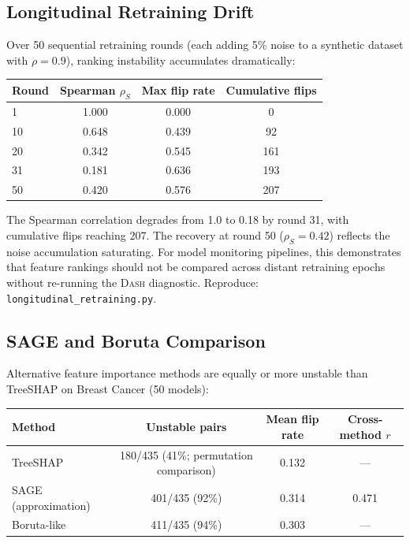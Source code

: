 \documentclass{article}
\newcommand{\DASH}{\textsc{Dash}}
\begin{document}
\subsection{Longitudinal Retraining Drift}
\label{sec:longitudinal}

Over 50 sequential retraining rounds (each adding 5\% noise to a synthetic dataset with $\rho{=}0.9$), ranking instability accumulates dramatically:

\begin{center}
\small
\begin{tabular}{@{}lccc@{}}
\toprule
Round & Spearman $\rho_S$ & Max flip rate & Cumulative flips \\
\midrule
1   & 1.000 & 0.000 & 0 \\
10  & 0.648 & 0.439 & 92 \\
20  & 0.342 & 0.545 & 161 \\
31  & 0.181 & 0.636 & 193 \\
50  & 0.420 & 0.576 & 207 \\
\bottomrule
\end{tabular}
\end{center}

The Spearman correlation degrades from 1.0 to 0.18 by round 31, with cumulative flips reaching 207. The recovery at round 50 ($\rho_S{=}0.42$) reflects the noise accumulation saturating. For model monitoring pipelines, this demonstrates that feature rankings should not be compared across distant retraining epochs without re-running the \DASH{} diagnostic.
Reproduce: \texttt{longitudinal\_retraining.py}.

\subsection{SAGE and Boruta Comparison}
\label{sec:sage-comparison}

Alternative feature importance methods are equally or more unstable than TreeSHAP on Breast Cancer (50 models):

\begin{center}
\small
\begin{tabular}{@{}lccc@{}}
\toprule
Method & Unstable pairs & Mean flip rate & Cross-method $r$ \\
\midrule
TreeSHAP             & 180/435 (41\%; permutation comparison) & 0.132 & --- \\
SAGE (approximation) & 401/435 (92\%) & 0.314 & 0.471 \\
Boruta-like          & 411/435 (94\%) & 0.303 & --- \\
\bottomrule
\end{tabular}
\end{center}
\end{document}
